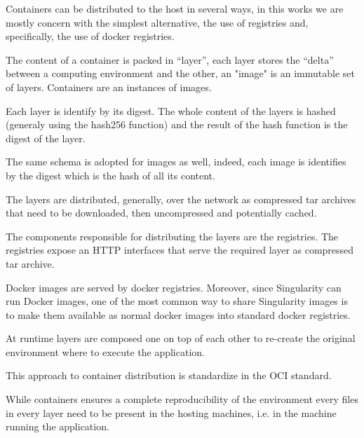 Containers can be distributed to the host in several ways, in this works we are mostly concern with the simplest alternative, the use of registries and, specifically, the use of docker registries.

The content of a container is packed in “layer”, each layer stores the “delta” between a computing environment and the other, an "image" is an immutable set of layers. Containers are an instances of images.

Each layer is identify by its digest. The whole content of the layers is hashed (generaly using the hash256 function) and the result of the hash function is the digest of the layer.

The same schema is adopted for images as well, indeed, each image is identifies by the digest which is the hash of all its content.

The layers are distributed, generally, over the network as compressed tar archives that need to be downloaded, then uncompressed and potentially cached.

The components responsible for distributing the layers are the registries. The registries expose an HTTP interfaces that serve the required layer as compressed tar archive.

Docker images are served by docker registries. Moreover, since Singularity can run Docker images, one of the most common way to share Singularity images is to make them available as normal docker images into standard docker registries. 

At runtime layers are composed one on top of each other to re-create the original environment where to execute the application.

This approach to container distribution is standardize in the OCI standard.

While containers ensures a complete reproducibility of the environment every files in every layer need to be present in the hosting machines, i.e. in the machine running the application.


